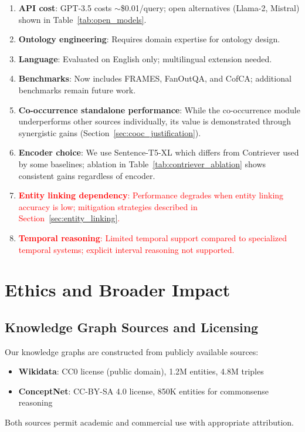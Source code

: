\documentclass[10pt,twocolumn]{article}
\newcommand{\revisioncritical}[1]{\textcolor{red}{#1}}
\begin{document}
\begin{enumerate}
    \item \textbf{API cost}: GPT-3.5 costs $\sim$\$0.01/query; open alternatives (Llama-2, Mistral) shown in Table~\ref{tab:open_models}.
    \item \textbf{Ontology engineering}: Requires domain expertise for ontology design.
    \item \textbf{Language}: Evaluated on English only; multilingual extension needed.
    \item \textbf{Benchmarks}: Now includes FRAMES, FanOutQA, and CofCA; additional benchmarks remain future work.
    \item \textbf{Co-occurrence standalone performance}: While the co-occurrence module underperforms other sources individually, its value is demonstrated through synergistic gains (Section~\ref{sec:cooc_justification}).
    \item \textbf{Encoder choice}: We use Sentence-T5-XL which differs from Contriever used by some baselines; ablation in Table~\ref{tab:contriever_ablation} shows consistent gains regardless of encoder.
    \item \revisioncritical{\textbf{Entity linking dependency}: Performance degrades when entity linking accuracy is low; mitigation strategies described in Section~\ref{sec:entity_linking}.}
    \item \revisioncritical{\textbf{Temporal reasoning}: Limited temporal support compared to specialized temporal systems; explicit interval reasoning not supported.}
\end{enumerate}

\section{Ethics and Broader Impact}

\subsection{Knowledge Graph Sources and Licensing}
Our knowledge graphs are constructed from publicly available sources:
\begin{itemize}
    \item \textbf{Wikidata}: CC0 license (public domain), 1.2M entities, 4.8M triples
    \item \textbf{ConceptNet}: CC-BY-SA 4.0 license, 850K entities for commonsense reasoning
\end{itemize}
Both sources permit academic and commercial use with appropriate attribution.
\end{document}
